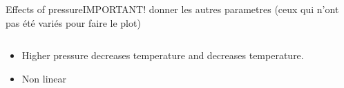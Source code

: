 \documentclass[10pt]{beamer}
\begin{document}
\begin{frame}{Effects of pressure}{IMPORTANT! donner les autres parametres (ceux qui n'ont pas été variés pour faire le plot)}

    \begin{columns}
        \centering


        \centering

    \end{columns}
    \begin{itemize}
        \item Higher pressure decreases temperature and decreases temperature.
        \item Non linear
    \end{itemize}
\end{frame}
\end{document}
